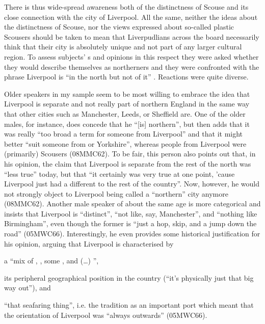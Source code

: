 There is thus wide-spread awareness both of the distinctness of Scouse and its close connection with the city of Liverpool.
All the same, neither the ideas about the distinctness of Scouse, nor the views expressed about so-called plastic Scou\-sers should be taken to mean that Liverpudlians across the board necessarily think that their city is absolutely unique and not part of any larger cultural region.
To assess subjects' s and opinions in this respect they were asked whether they would describe themselves as northerners and they were confronted with the phrase Liverpool is ``in the north but not of it'' \parencite[xxx]{belchem2006b}.
Reactions were quite diverse.

Older speakers in my sample seem to be most willing to embrace the idea that Liverpool is separate and not really part of northern England in the same way that other cities such as Manchester, Leeds, or Sheffield are.
One of the older males, for instance, does concede that he ``[is] northern'', but then adds that it was really ``too broad a term for someone from Liverpool'' and that it might better ``suit someone from  or Yorkshire'', whereas people from Liverpool were (primarily) Scousers (08MMC62).
To be fair, this person also points out that, in his opinion, the claim that Liverpool is separate from the rest of the north was ``less true'' today, but that ``it certainly was very true at one point, 'cause Liverpool just had a different  to the rest of the country''.
Now, however, he would not strongly object to Liverpool being called a ``northern'' city anymore (08MMC62).
Another male speaker of about the same age is more categorical and insists that Liverpool is ``distinct'', ``not like, say, Manchester'', and ``nothing like Birmingham'', even though the former is ``just a hop, skip, and a jump down the road'' (05MWC66).
Interestingly, he even provides some historical justification for his opinion, arguing that Liverpool is characterised by
\begin{inparaenum}[(1)]
	\item a ``mix of , , some , and (\ldots) '',
	\item its peripheral geographical position in the country (``it's physically just that big way out''), and
	\item ``that seafaring thing'', i.e. the tradition as an important port which meant that the orientation of Liverpool was ``always outwards'' (05MWC66).
\end{inparaenum}

